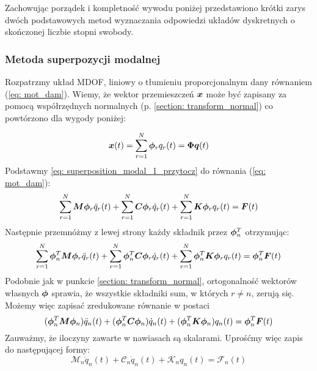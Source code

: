  Zachowując porządek i kompletność wywodu poniżej przedstawiono krótki zarys dwóch podstawowych metod wyznaczania odpowiedzi układów dyskretnych o skończonej liczbie stopni swobody.
 
 \subsubsection{Metoda superpozycji modalnej}
Rozpatrzmy układ MDOF, liniowy o tłumieniu proporcjonalnym dany równaniem (\ref{eq: mot_dam}). Wiemy, że wektor przemieszczeń $\bm{x}$ może być zapisany za pomocą współrzędnych normalnych (p. \ref{section: transform_normal}) co powtórzono dla wygody poniżej:

\begin{equation} \label{eq: superposition_modal_1_przytocz}
	\bm{x}(t) = \sum_{r=1}^{N} \bm{\phi}_r q_r(t)=\bm{\Phi q}(t)
\end{equation} 
Podstawmy \ref{eq: superposition_modal_1_przytocz} do równania (\ref{eq: mot_dam}):
\begin{equation} \label{eq: superposition_modal_2_podstaw}
	\sum_{r=1}^{N} \bm{M} \bm{\phi}_r \ddot{q}_r(t) +\sum_{r=1}^{N} \bm{C}\bm{\phi}_r \dot{q}_r(t) + \sum_{r=1}^{N} \bm{K}\bm{\phi}_r q_r(t) = \bm{F}(t)
\end{equation} 
Następnie przemnóżmy z lewej strony każdy składnik przez $\bm{\phi}_n^T$ otrzymując:
\begin{equation} \label{eq: superposition_modal_3_przemnoz}
	\sum_{r=1}^{N} \bm{\phi}_n^T \bm{M} \bm{\phi}_r \ddot{q}_r(t) +\sum_{r=1}^{N} \bm{\phi}_n^T \bm{C}\bm{\phi}_r \dot{q}_r(t) + \sum_{r=1}^{N} \bm{\phi}_n^T \bm{K}\bm{\phi}_r q_r(t) = \bm{\phi}_n^T \bm{F}(t)
\end{equation} 
Podobnie jak w punkcie \ref{section: transform_normal}, ortogonalność wektorów własnych $\bm{\phi}$ sprawia, że wszystkie składniki sum, w których $r\neq n$, zerują się. Możemy więc zapisać zredukowane równanie w postaci
\begin{equation} \label{eq: superposition_modal_4_orto}
	 (\bm{\phi}_n^T \bm{M} \bm{\phi}_n )\ddot{q}_n(t) + (\bm{\phi}_n^T \bm{C}\bm{\phi}_n) \dot{q}_n(t) + (\bm{\phi}_n^T \bm{K}\bm{\phi}_n) q_n(t) = \bm{\phi}_n^T \bm{F}(t)
\end{equation} 
Zauważmy, że iloczyny zawarte w nawiasach są skalarami. Uprośćmy więc zapis do następującej formy:
\begin{equation} \label{eq: superposition_modal_5_uprosc}
	\mathcal{M}_n\ddot{q}_n(t) + \mathcal{C}_n\dot{q}_n(t) + \mathcal{K}_n q_n(t) = \mathcal{F}_n(t)
\end{equation} 
